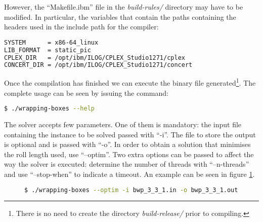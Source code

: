 However, the ``Makefile.ibm'' file in the \textit{build-rules/} directory may have
to be modified. In particular, the variables that contain the paths containing the
headers used in the include path for the compiler:
\begin{lstlisting}[language=bash]
SYSTEM		= x86-64_linux
LIB_FORMAT	= static_pic
CPLEX_DIR	= /opt/ibm/ILOG/CPLEX_Studio1271/cplex
CONCERT_DIR	= /opt/ibm/ILOG/CPLEX_Studio1271/concert
\end{lstlisting}

Once the compilation has finished we can execute the binary file generated\footnote{ There
is no need to create the directory \textit{build-release/} prior to compiling.}. The
complete usage can be seen by issuing the command:
\begin{lstlisting}[language=bash]
$ ./wrapping-boxes --help
\end{lstlisting}

The solver accepts few parameters. One of them is mandatory: the input file
containing the instance to be solved passed with ``-i''. The file to store
the output is optional and is passed with ``-o''. In order to obtain a solution
that minimises the roll length used, use ``--optim''. Two extra options can
be passed to affect the way the solver is executed: determine the number of
threads with ``--n-threads'' and use ``--stop-when'' to indicate a timeout.
An example can be seen in figure \ref{fig:linear-programming:example-usage}.

\begin{figure}[H]
\centering
\begin{lstlisting}[language=bash,basicstyle=\centering]
$ ./wrapping-boxes --optim -i bwp_3_3_1.in -o bwp_3_3_1.out --n-threads 8
\end{lstlisting}
\label{fig:linear-programming:example-usage}
\end{figure}





